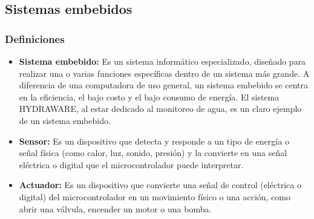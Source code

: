 \documentclass[a4paper,12pt]{article}
\begin{document}
	
	\subsection{Sistemas embebidos}
	\subsubsection{Definiciones}
	\begin{itemize}
		\item \textbf{Sistema embebido:} Es un sistema informático especializado, diseñado para realizar una o varias funciones específicas dentro de un sistema más grande. A diferencia de una computadora de uso general, un sistema embebido se centra en la eficiencia, el bajo costo y el bajo consumo de energía. El sistema HYDRAWARE, al estar dedicado al monitoreo de agua, es un claro ejemplo de un sistema embebido.
		\item \textbf{Sensor:} Es un dispositivo que detecta y responde a un tipo de energía o señal física (como calor, luz, sonido, presión) y la convierte en una señal eléctrica o digital que el microcontrolador puede interpretar.
		\item \textbf{Actuador:} Es un dispositivo que convierte una señal de control (eléctrica o digital) del microcontrolador en un movimiento físico o una acción, como abrir una válvula, encender un motor o una bomba.
	\end{itemize}
	
\end{document}
